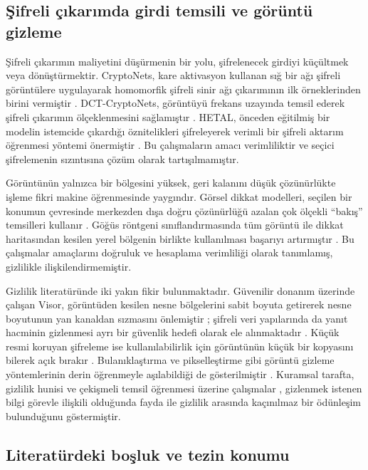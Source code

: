 \subsection{Şifreli çıkarımda girdi temsili ve görüntü gizleme}\label{lit:representation}

Şifreli çıkarımın maliyetini düşürmenin bir yolu, şifrelenecek girdiyi küçültmek veya dönüştürmektir. CryptoNets, kare aktivasyon kullanan sığ bir ağı şifreli görüntülere uygulayarak homomorfik şifreli sinir ağı çıkarımının ilk örneklerinden birini vermiştir \cite{giladbachrach2016cryptonets}. DCT-CryptoNets, görüntüyü frekans uzayında temsil ederek şifreli çıkarımın ölçeklenmesini sağlamıştır \cite{roy2025dctcryptonets}. HETAL, önceden eğitilmiş bir modelin istemcide çıkardığı öznitelikleri şifreleyerek verimli bir şifreli aktarım öğrenmesi yöntemi önermiştir \cite{lee2023hetal}. Bu çalışmaların amacı verimliliktir ve seçici şifrelemenin sızıntısına çözüm olarak tartışılmamıştır.

Görüntünün yalnızca bir bölgesini yüksek, geri kalanını düşük çözünürlükte işleme fikri makine öğrenmesinde yaygındır. Görsel dikkat modelleri, seçilen bir konumun çevresinde merkezden dışa doğru çözünürlüğü azalan çok ölçekli ``bakış'' temsilleri kullanır \cite{mnih2014attention}. Göğüs röntgeni sınıflandırmasında tüm görüntü ile dikkat haritasından kesilen yerel bölgenin birlikte kullanılması başarıyı artırmıştır \cite{guan2018agcnn}. Bu çalışmalar amaçlarını doğruluk ve hesaplama verimliliği olarak tanımlamış, gizlilikle ilişkilendirmemiştir.

Gizlilik literatüründe iki yakın fikir bulunmaktadır. Güvenilir donanım üzerinde çalışan Visor, görüntüden kesilen nesne bölgelerini sabit boyuta getirerek nesne boyutunun yan kanaldan sızmasını önlemiştir \cite{poddar2020visor}; şifreli veri yapılarında da yanıt hacminin gizlenmesi ayrı bir güvenlik hedefi olarak ele alınmaktadır \cite{kamara2019volume}. Küçük resmi koruyan şifreleme ise kullanılabilirlik için görüntünün küçük bir kopyasını bilerek açık bırakır \cite{tajik2019tpe}. Bulanıklaştırma ve pikselleştirme gibi görüntü gizleme yöntemlerinin derin öğrenmeyle aşılabildiği de gösterilmiştir \cite{mcpherson2016obfuscation}. Kuramsal tarafta, gizlilik hunisi \cite{makhdoumi2014funnel} ve çekişmeli temsil öğrenmesi üzerine çalışmalar \cite{zhao2020tradeoffs}, gizlenmek istenen bilgi görevle ilişkili olduğunda fayda ile gizlilik arasında kaçınılmaz bir ödünleşim bulunduğunu göstermiştir.

\subsection{Literatürdeki boşluk ve tezin konumu}\label{lit:gap}

